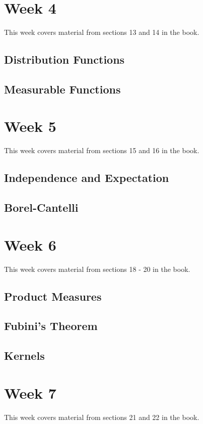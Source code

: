 \documentclass[12pt]{article}
\begin{document}
\section{Week 4}
This week covers material from sections 13 and 14 in the book.

\subsection{Distribution Functions}

\subsection{Measurable Functions}


\section{Week 5}
This week covers material from sections 15 and 16 in the book.

\subsection{Independence and Expectation}

\subsection{Borel-Cantelli}


\section{Week 6}
This week covers material from sections 18 - 20 in the book.

\subsection{Product Measures}

\subsection{Fubini's Theorem}

\subsection{Kernels}


\section{Week 7}
This week covers material from sections 21 and 22 in the book.
\end{document}
